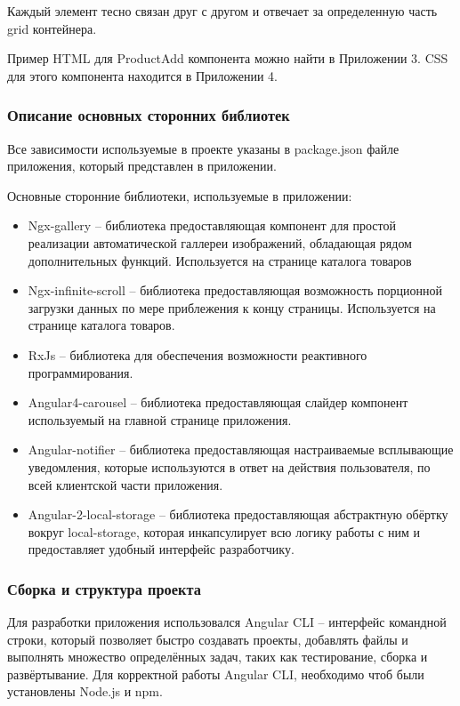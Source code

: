 Каждый элемент тесно связан друг с другом и отвечает за определенную часть grid контейнера.

Пример HTML для ProductAdd компонента можно найти в Приложении 3.
CSS для этого компонента находится в Приложении 4.

\subsubsection{Описание основных сторонних библиотек}\indent

Все зависимости используемые в проекте указаны в package.json файле приложения, который представлен в приложении.

Основные сторонние библиотеки, используемые в приложении:
\begin{itemize}
    \item Ngx-gallery – библиотека предоставляющая компонент для простой реализации автоматической галлереи изображений, обладающая рядом дополнительных функций.
    Используется на странице каталога товаров
    \item Ngx-infinite-scroll – библиотека предоставляющая возможность порционной загрузки данных по мере приблежения к концу страницы.
    Используется на странице каталога товаров.
    \item RxJs – библиотека для обеспечения возможности реактивного программирования.
    \item Angular4-carousel – библиотека предоставляющая слайдер компонент используемый на главной странице приложения.
    \item Angular-notifier – библиотека предоставляющая настраиваемые всплывающие уведомления, которые используются в ответ на действия пользователя, по всей клиентской части приложения.
    \item Angular-2-local-storage – библиотека предоставляющая абстрактную обёртку вокруг local-storage, которая инкапсулирует всю логику работы с ним и предоставляет удобный интерфейс разработчику.
\end{itemize}

\subsubsection{Сборка и структура проекта}\indent

Для разработки приложения использовался Angular CLI – интерфейс командной строки, который позволяет быстро создавать проекты, добавлять файлы и выполнять множество определённых задач, таких как тестирование, сборка и развёртывание.
Для корректной работы Angular CLI, необходимо чтоб были установлены Node.js и npm.

